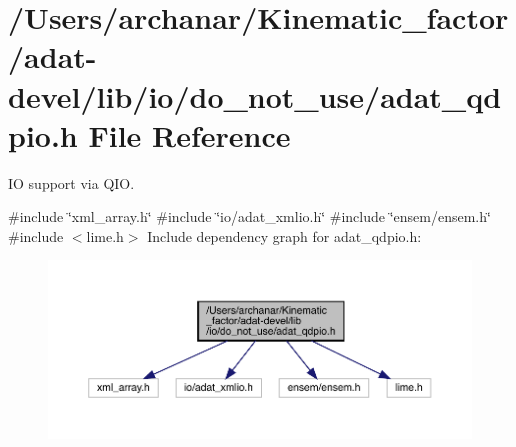 \hypertarget{adat-devel_2lib_2io_2do__not__use_2adat__qdpio_8h}{}\section{/\+Users/archanar/\+Kinematic\+\_\+factor/adat-\/devel/lib/io/do\+\_\+not\+\_\+use/adat\+\_\+qdpio.h File Reference}
\label{adat-devel_2lib_2io_2do__not__use_2adat__qdpio_8h}


IO support via Q\+IO.  


{\ttfamily \#include \char`\"{}xml\+\_\+array.\+h\char`\"{}}\newline
{\ttfamily \#include \char`\"{}io/adat\+\_\+xmlio.\+h\char`\"{}}\newline
{\ttfamily \#include \char`\"{}ensem/ensem.\+h\char`\"{}}\newline
{\ttfamily \#include $<$lime.\+h$>$}\newline
Include dependency graph for adat\+\_\+qdpio.\+h\+:
\nopagebreak
\begin{figure}[H]
\begin{center}
\leavevmode
\includegraphics[width=350pt]{d5/da1/adat-devel_2lib_2io_2do__not__use_2adat__qdpio_8h__incl}
\end{center}
\end{figure}
